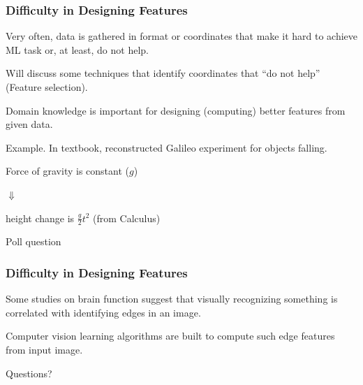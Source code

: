 \documentclass{beamer}
\newenvironment{codeblock}
    {\hfill\begin{beamerboxesrounded}[lower=codecol, width=0.8\textwidth]
    \medskip

    }
    { 
    \end{beamerboxesrounded}\hfill
    }
\theoremstyle{example}
\begin{document}
\begin{frame}
\frametitle{Difficulty in Designing Features}
Very often, data is gathered in format or coordinates that make it hard to achieve ML task or, at least, do not help.

Will discuss some techniques that identify coordinates that ``do not help'' (Feature selection).

\pause
Domain knowledge is important for designing (computing) better features from given data.

\pause
\begin{codeblock}
        \textcolor{mygreen}{Example.} In textbook, reconstructed Galileo experiment for objects falling. 

        \begin{center}Force of gravity is constant ($g$) 
            
            $\Downarrow$ 
            
        height change is $\frac{g}{2}t^2$ (from Calculus)
        \end{center}
\end{codeblock}

\end{frame}

\begin{frame}[standout]
    Poll question
\end{frame}

\begin{frame}
\frametitle{Difficulty in Designing Features}
Some studies on brain function suggest that visually recognizing something is correlated with identifying edges in an image.

Computer vision learning algorithms are built to compute such edge features from input image.

\pause
\begin{center}
\end{center}
\end{frame}

{
\begin{frame}[standout]
    Questions?
\end{frame}
}
\end{document}
